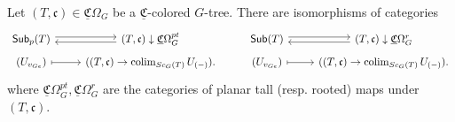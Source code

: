 \documentclass[a4paper,10pt
]{article}%
\renewcommand{\1}{\ensuremath{\mathbb{id}}}
\begin{document}
\begin{lemma}[{cf. \cite[Prop. 3.41]{BP17}}]
      Let $(T,\mathfrak c) \in \underline{\mathfrak C}\Omega_G$ be a $\underline{\mathfrak C}$-colored $G$-tree.
      There are isomorphisms of categories
      \begin{equation}
            \label{SUB_EQUIV_EQ}
            \begin{tikzcd}[row sep = 4pt]
                  \mathsf{Sub}_p(T) \arrow[r, shift left]
                  &
                  (T, \mathfrak c) \downarrow \underline{\mathfrak C}\Omega_G^{pt}
                  \arrow[l, shift left]
                  &
                  \mathsf{Sub}(T) \arrow[r, shift left]
                  &
                  (T, \mathfrak c) \downarrow \underline{\mathfrak C}\Omega_G^{r}
                  \arrow[l, shift left]                  
                  \\
                  (U_{v_{Ge}}) \arrow[r, mapsto]
                  &
                  ((T, \mathfrak c) \to \colim_{Sc_G(T)}U_{(-)}).
                  &
                  (U_{v_{Ge}}) \arrow[r, mapsto]
                  &
                  ((T, \mathfrak c) \to \colim_{Sc_G(T)}U_{(-)}).
            \end{tikzcd}
      \end{equation}
      where $\underline{\mathfrak C}\Omega_G^{pt}, \underline{\mathfrak C}\Omega_G^{r}$ are the categories of planar tall (resp. rooted) maps under $(T, \mathfrak c)$. 
\end{lemma}
\end{document}
